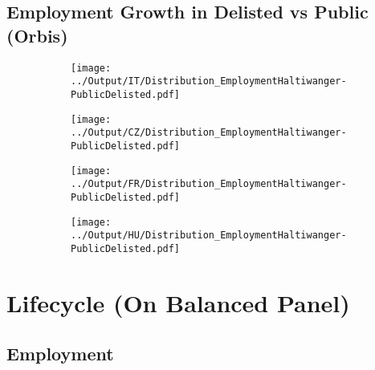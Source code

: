 \documentclass[12pt,notitlepage]{article}
\begin{document}
\subsection{Employment Growth in Delisted vs Public (Orbis)}
\begin{figure}[!htpb]
\centering
\begin{subfigure}{.49\textwidth}
    \centering
 \texttt{[image: ../Output/IT/Distribution\_EmploymentHaltiwanger-PublicDelisted.pdf]}
\end{subfigure}%
\begin{subfigure}{.49\textwidth}
    \centering
 \texttt{[image: ../Output/CZ/Distribution\_EmploymentHaltiwanger-PublicDelisted.pdf]}
\end{subfigure}
\begin{subfigure}{.49\textwidth}
    \centering
 \texttt{[image: ../Output/FR/Distribution\_EmploymentHaltiwanger-PublicDelisted.pdf]}
\end{subfigure}%
\begin{subfigure}{.49\textwidth}
    \centering
 \texttt{[image: ../Output/HU/Distribution\_EmploymentHaltiwanger-PublicDelisted.pdf]}
\end{subfigure}
\end{figure}
\pagebreak



\FloatBarrier
\section{Lifecycle (On Balanced Panel)} %
\label{sec:lifecycle}
\FloatBarrier

\subsection{Employment} %
\label{sec:employment}
\end{document}
